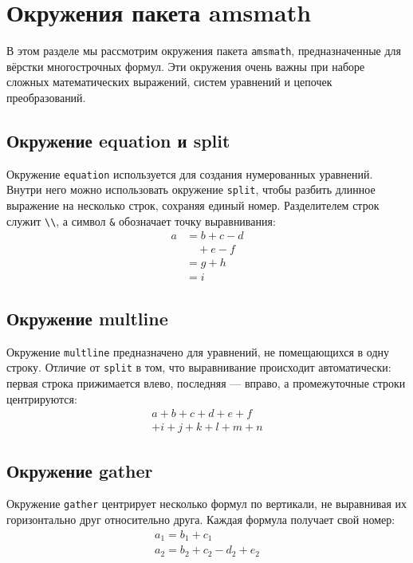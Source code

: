 \section{Окружения пакета amsmath}
\par В этом разделе мы рассмотрим окружения пакета \verb"amsmath", предназначенные для вёрстки многострочных формул. Эти окружения очень важны при наборе сложных математических выражений, систем уравнений и цепочек преобразований.

\subsection{Окружение equation и split}
\par Окружение \verb"equation" используется для создания нумерованных уравнений. Внутри него можно использовать окружение \verb"split", чтобы разбить длинное выражение на несколько строк, сохраняя единый номер. Разделителем строк служит \verb"\\", а символ \verb"&" обозначает точку выравнивания:
\begin{equation}\label{eq:one}
    \begin{split}
      a & = b+c-d\\
        & \quad +e-f\\
        & =g+h\\
        & =i
    \end{split}
\end{equation}

\subsection{Окружение multline}
\par Окружение \verb"multline" предназначено для уравнений, не помещающихся в одну строку. Отличие от \verb"split" в том, что выравнивание происходит автоматически: первая строка прижимается влево, последняя --- вправо, а промежуточные строки центрируются:
\begin{multline}
    a+b+c+d+e+f\\
    +i+j+k+l+m+n
\end{multline}

\subsection{Окружение gather}
\par Окружение \verb"gather" центрирует несколько формул по вертикали, не выравнивая их горизонтально друг относительно друга. Каждая формула получает свой номер:
\begin{gather}
    a_1=b_1+c_1\\
    a_2=b_2+c_2-d_2+e_2
\end{gather}

